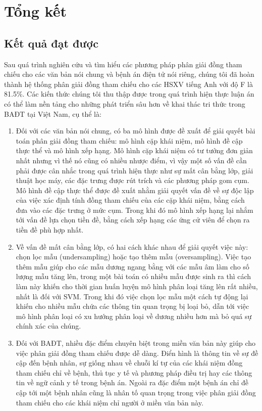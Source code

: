 \chapter{Tổng kết}

\section{Kết quả đạt được}
Sau quá trình nghiên cứu và tìm hiểu các phương pháp phân giải đồng tham chiếu cho các văn bản nói chung và bệnh án điện tử nói riêng, chúng tôi đã hoàn thành hệ thống phân giải đồng tham chiếu cho các HSXV tiếng Anh với độ F là 81.5\%. Các kiến thức chúng tôi thu thập được trong quá trình hiện thực luận án có thể làm nền tảng cho những phát triển sâu hơn về khai thác tri thức trong BAĐT tại Việt Nam, cụ thể là:
\begin{enumerate}
\item Đối với các văn bản nói chung, có ba mô hình được đề xuất để giải quyết bài toán phân giải đồng tham chiếu: mô hình cặp khái niệm, mô hình đề cập thực thể và mô hình xếp hạng. Mô hình cặp khái niệm có tư tưởng đơn giản nhất nhưng vì thế nó cũng có nhiều nhược điểm, vì vậy một số vấn đề cần phải được cân nhắc trong quá trình hiện thực như sự mất cân bằng lớp, giải thuật học máy, các đặc trưng được rút trích và các phương pháp gom cụm. Mô hình đề cập thực thể được đề xuất nhằm giải quyết vấn đề về sự độc lập của việc xác định tính đồng tham chiếu của các cặp khái niệm, bằng cách đưa vào các đặc trưng ở mức cụm. Trong khi đó mô hình xếp hạng lại nhắm tới vấn đề lựa chọn tiền đề, bằng cách xếp hạng các ứng cử viên để chọn ra tiền đề phù hợp nhất. 
\item Về vấn đề mất cân bằng lớp, có hai cách khác nhau để giải quyết việc này: chọn lọc mẫu (undersampling) hoặc tạo thêm mẫu (oversampling). Việc tạo thêm mẫu giúp cho các mẫu dương ngang bằng với các mẫu âm làm cho số lượng mẫu tăng lên, trong một bài toán có nhiều mẫu được sinh ra thì cách làm này khiến cho thời gian huấn luyện mô hình phân loại tăng lên rất nhiều, nhất là đối với SVM. Trong khi đó việc chọn lọc mẫu một cách tự động lại khiến cho nhiều mẫu chứa các thông tin quan trọng bị loại bỏ, dẫn tới việc mô hình phân loại có xu hướng phân loại về dương nhiều hơn mà bỏ quá sự chính xác của chúng.
\item Đối với BAĐT, nhiều đặc điểm chuyên biệt trong miền văn bản này giúp cho việc phân giải đồng tham chiếu được dễ dàng. Điển hình là thông tin về sự đề cập đến bệnh nhân, sự giống nhau về chuỗi kí tự của các khái niệm đồng tham chiếu chỉ về bệnh, thủ tục y tế và phương pháp điều trị hay các thông tin về ngữ cảnh y tế trong bệnh án. Ngoài ra đặc điểm một bệnh án chỉ đề cập tới một bệnh nhân cũng là nhân tố quan trọng trong việc phân giải đồng tham chiếu cho các khái niệm chỉ người ở miền văn bản này.
\end{enumerate}

